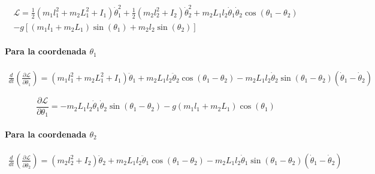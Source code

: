 \begin{multline}
\mathcal{L} = \frac{1}{2}(m_1l_1^2 + m_2L_1^2 + I_1)\dot{\theta}_1^2 + \frac{1}{2}(m_2l_2^2 + I_2)\dot{\theta}_2^2 + m_2L_1l_2\dot{\theta}_1\dot{\theta}_2\cos(\theta_1 - \theta_2) \\
- g[(m_1l_1 + m_2L_1)\sin(\theta_1) + m_2l_2\sin(\theta_2)]
\end{multline}

\paragraph{Para la coordenada $\theta_1$}



\begin{multline}
\frac{d}{dt}\left(\frac{\partial \mathcal{L}}{\partial \dot{\theta}_1}\right) = (m_1l_1^2 + m_2L_1^2 + I_1)\ddot{\theta}_1 + m_2L_1l_2\ddot{\theta}_2\cos(\theta_1 - \theta_2) - m_2L_1l_2\dot{\theta}_2\sin(\theta_1 - \theta_2)(\dot{\theta}_1 - \dot{\theta}_2)
\end{multline}

\begin{equation}
\frac{\partial \mathcal{L}}{\partial \theta_1} = -m_2L_1l_2\dot{\theta}_1\dot{\theta}_2\sin(\theta_1 - \theta_2) - g(m_1l_1 + m_2L_1)\cos(\theta_1)
\end{equation}

\paragraph{Para la coordenada $\theta_2$}


\begin{multline}
\frac{d}{dt}\left(\frac{\partial \mathcal{L}}{\partial \dot{\theta}_2}\right) = (m_2l_2^2 + I_2)\ddot{\theta}_2 + m_2L_1l_2\ddot{\theta}_1\cos(\theta_1 - \theta_2) - m_2L_1l_2\dot{\theta}_1\sin(\theta_1 - \theta_2)(\dot{\theta}_1 - \dot{\theta}_2)
\end{multline}

